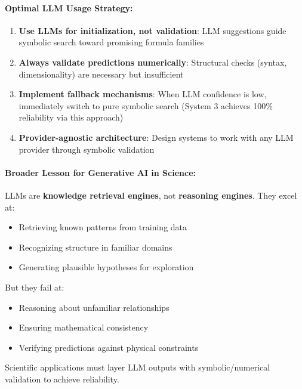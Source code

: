 \paragraph{Optimal LLM Usage Strategy:}

\begin{enumerate}
    \item \textbf{Use LLMs for initialization, not validation}: LLM suggestions guide symbolic search toward promising formula families

    \item \textbf{Always validate predictions numerically}: Structural checks (syntax, dimensionality) are necessary but insufficient

    \item \textbf{Implement fallback mechanisms}: When LLM confidence is low, immediately switch to pure symbolic search (System 3 achieves 100\% reliability via this approach)

    \item \textbf{Provider-agnostic architecture}: Design systems to work with any LLM provider through symbolic validation
\end{enumerate}

\paragraph{Broader Lesson for Generative AI in Science:}

LLMs are \textbf{knowledge retrieval engines}, not \textbf{reasoning engines}. They excel at:
\begin{itemize}
    \item Retrieving known patterns from training data
    \item Recognizing structure in familiar domains
    \item Generating plausible hypotheses for exploration
\end{itemize}

But they fail at:
\begin{itemize}
    \item Reasoning about unfamiliar relationships
    \item Ensuring mathematical consistency
    \item Verifying predictions against physical constraints
\end{itemize}

Scientific applications must layer LLM outputs with symbolic/numerical validation to achieve reliability.

